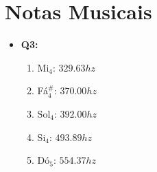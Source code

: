 \documentclass[a4paper, 12pt]{article}
\begin{document}
\section{Notas Musicais}
\begin{itemize}
    \item \textbf{Q3:}
          \begin{enumerate}
              \item[] Mi$_4$: $329.63hz$
              \item[] Fá$_4^\#$: $370.00hz$
              \item[] Sol$_4$: $392.00hz$
              \item[] Si$_4$: $493.89hz$
              \item[] Dó$_5$: $554.37hz$
          \end{enumerate}
\end{itemize}
\vspace{15px}
\end{document}
